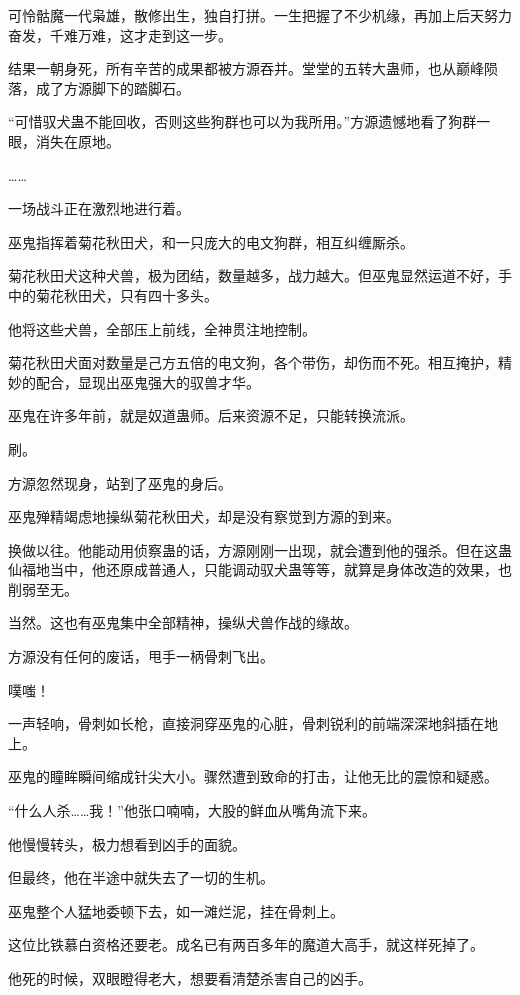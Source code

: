 \begin{this_body}
可怜骷魔一代枭雄，散修出生，独自打拼。一生把握了不少机缘，再加上后天努力奋发，千难万难，这才走到这一步。

结果一朝身死，所有辛苦的成果都被方源吞并。堂堂的五转大蛊师，也从巅峰陨落，成了方源脚下的踏脚石。

“可惜驭犬蛊不能回收，否则这些狗群也可以为我所用。”方源遗憾地看了狗群一眼，消失在原地。

……

一场战斗正在激烈地进行着。

巫鬼指挥着菊花秋田犬，和一只庞大的电文狗群，相互纠缠厮杀。

菊花秋田犬这种犬兽，极为团结，数量越多，战力越大。但巫鬼显然运道不好，手中的菊花秋田犬，只有四十多头。

他将这些犬兽，全部压上前线，全神贯注地控制。

菊花秋田犬面对数量是己方五倍的电文狗，各个带伤，却伤而不死。相互掩护，精妙的配合，显现出巫鬼强大的驭兽才华。

巫鬼在许多年前，就是奴道蛊师。后来资源不足，只能转换流派。

刷。

方源忽然现身，站到了巫鬼的身后。

巫鬼殚精竭虑地操纵菊花秋田犬，却是没有察觉到方源的到来。

换做以往。他能动用侦察蛊的话，方源刚刚一出现，就会遭到他的强杀。但在这蛊仙福地当中，他还原成普通人，只能调动驭犬蛊等等，就算是身体改造的效果，也削弱至无。

当然。这也有巫鬼集中全部精神，操纵犬兽作战的缘故。

方源没有任何的废话，甩手一柄骨刺飞出。

噗嗤！

一声轻响，骨刺如长枪，直接洞穿巫鬼的心脏，骨刺锐利的前端深深地斜插在地上。

巫鬼的瞳眸瞬间缩成针尖大小。骤然遭到致命的打击，让他无比的震惊和疑惑。

“什么人杀……我！”他张口喃喃，大股的鲜血从嘴角流下来。

他慢慢转头，极力想看到凶手的面貌。

但最终，他在半途中就失去了一切的生机。

巫鬼整个人猛地委顿下去，如一滩烂泥，挂在骨刺上。

这位比铁慕白资格还要老。成名已有两百多年的魔道大高手，就这样死掉了。

他死的时候，双眼瞪得老大，想要看清楚杀害自己的凶手。


\end{this_body}
